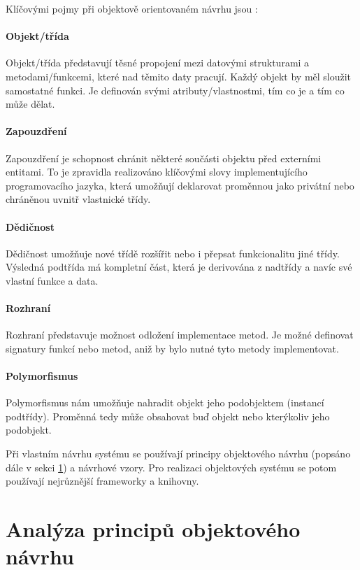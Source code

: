 Klíčovými pojmy při objektově orientovaném návrhu jsou \cite{wiki:oop_design}:

\paragraph{Objekt/třída}  Objekt/třída představují těsné propojení mezi datovými strukturami a metodami/funkcemi, které nad těmito daty pracují. Každý objekt by měl sloužit samostatné funkci. Je definován svými atributy/vlastnostmi, tím co je a tím co může dělat.
\paragraph{Zapouzdření} Zapouzdření je schopnost chránit některé součásti objektu před externími entitami. To je zpravidla realizováno klíčovými slovy implementujícího programovacího jazyka, která umožňují deklarovat proměnnou jako privátní nebo chráněnou uvnitř vlastnické třídy.
\paragraph{Dědičnost} Dědičnost umožňuje nové třídě rozšířit nebo i přepsat funkcionalitu jiné třídy. Výsledná podtřída má kompletní část, která je derivována z nadtřídy a navíc své vlastní funkce a data.
\paragraph{Rozhraní} Rozhraní představuje možnost odložení implementace metod. Je možné definovat signatury funkcí nebo metod, aniž by bylo nutné tyto metody implementovat.
\paragraph{Polymorfismus} Polymorfismus nám umožňuje nahradit objekt jeho podobjektem (instancí podtřídy). Proměnná tedy může obsahovat buď objekt nebo kterýkoliv jeho podobjekt.

Při vlastním návrhu systému se používají principy objektového návrhu (popsáno dále v sekci \ref{analysis-oop_design_principles}) a návrhové vzory. Pro realizaci objektových systému se potom používají nejrůznější frameworky a knihovny.

\section{Analýza principů objektového návrhu}
\label{analysis-oop_design_principles}

